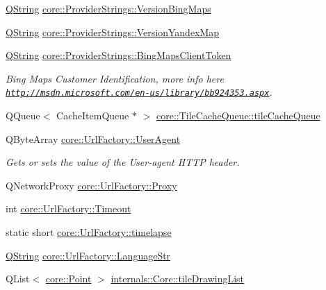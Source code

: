 \begin{DoxyCompactItemize}
\hyperlink{group___u_a_v_objects_plugin_gab9d252f49c333c94a72f97ce3105a32d}{\-Q\-String} \hyperlink{group___o_p_map_widget_ga98d1eeb119258d3fb9fab1a550604eb0}{core\-::\-Provider\-Strings\-::\-Version\-Bing\-Maps}
\item 
\hyperlink{group___u_a_v_objects_plugin_gab9d252f49c333c94a72f97ce3105a32d}{\-Q\-String} \hyperlink{group___o_p_map_widget_ga4e8dc0424dc67c6a4248f5bb6a770403}{core\-::\-Provider\-Strings\-::\-Version\-Yandex\-Map}
\item 
\hyperlink{group___u_a_v_objects_plugin_gab9d252f49c333c94a72f97ce3105a32d}{\-Q\-String} \hyperlink{group___o_p_map_widget_ga4c3a944c12deba7b13251f0c04685ac6}{core\-::\-Provider\-Strings\-::\-Bing\-Maps\-Client\-Token}
\begin{DoxyCompactList}\small\item\em \-Bing \-Maps \-Customer \-Identification, more info here \href{http://msdn.microsoft.com/en-us/library/bb924353.aspx}{\tt http\-://msdn.\-microsoft.\-com/en-\/us/library/bb924353.\-aspx}. \end{DoxyCompactList}\item 
\-Q\-Queue$<$ \-Cache\-Item\-Queue $\ast$ $>$ \hyperlink{group___o_p_map_widget_ga6bb4a109ac678df86dff7fe8a1a02944}{core\-::\-Tile\-Cache\-Queue\-::tile\-Cache\-Queue}
\item 
\-Q\-Byte\-Array \hyperlink{group___o_p_map_widget_ga9dbf3d049cf1947db76a0c87dd0821fc}{core\-::\-Url\-Factory\-::\-User\-Agent}
\begin{DoxyCompactList}\small\item\em \-Gets or sets the value of the \-User-\/agent \-H\-T\-T\-P header. \end{DoxyCompactList}\item 
\-Q\-Network\-Proxy \hyperlink{group___o_p_map_widget_ga4851a6205d1885048a3417f736ec8679}{core\-::\-Url\-Factory\-::\-Proxy}
\item 
int \hyperlink{group___o_p_map_widget_gaee21c04663fde2b41c6d471456dc7325}{core\-::\-Url\-Factory\-::\-Timeout}
\item 
static short \hyperlink{group___o_p_map_widget_ga5dba09925e03ae10c70290f9a2e9cc61}{core\-::\-Url\-Factory\-::timelapse}
\item 
\hyperlink{group___u_a_v_objects_plugin_gab9d252f49c333c94a72f97ce3105a32d}{\-Q\-String} \hyperlink{group___o_p_map_widget_ga5d9399e074794da8ad0593e87e554228}{core\-::\-Url\-Factory\-::\-Language\-Str}
\item 
\-Q\-List$<$ \hyperlink{structcore_1_1_point}{core\-::\-Point} $>$ \hyperlink{group___o_p_map_widget_gaef8eae2b290cfd062061e8baaebe51d6}{internals\-::\-Core\-::tile\-Drawing\-List}

\end{DoxyCompactItemize}
